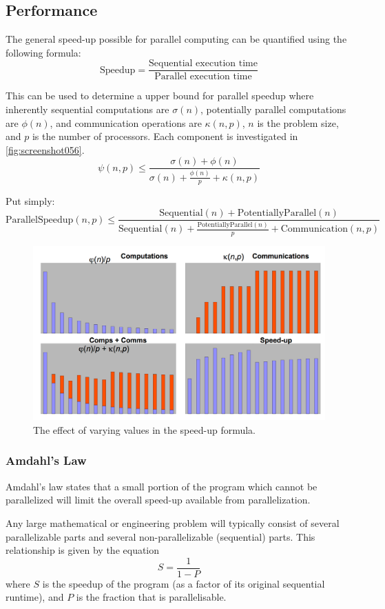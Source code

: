 \subsection{Performance}
The general speed-up possible for parallel computing can be quantified using the following formula:
\[ \text{Speedup} = \frac{\text{Sequential execution time}}{\text{Parallel execution time}} \]

This can be used to determine a upper bound for parallel speedup where inherently sequential computations are $\sigma(n)$, potentially parallel computations are $\phi(n)$, and communication operations are $\kappa(n, p)$, $n$ is the problem size, and $p$ is the number of processors. Each component is investigated in \autoref{fig:screenshot056}.
\[ \psi(n,p) \le \frac{\sigma(n) + \phi(n)}{\sigma(n) + \frac{\phi(n)}{p} + \kappa(n, p)} \]

Put simply:
\[ \text{ParallelSpeedup}(n,p) \le \frac{\text{Sequential}(n) + \text{PotentiallyParallel}(n)}{\text{Sequential}(n) + \frac{\text{PotentiallyParallel}(n)}{p} + \text{Communication}(n, p)} \]

\begin{figure}
\centering
\includegraphics[width=0.7\linewidth]{screenshot056}
\caption{The effect of varying values in the speed-up formula.}
\label{fig:screenshot056}
\end{figure}

\subsubsection{Amdahl's Law}
Amdahl's law states that a small portion of the program which cannot be parallelized will limit the overall speed-up available from parallelization. 

Any large mathematical or engineering problem will typically consist of several parallelizable parts and several non-parallelizable (sequential) parts. This relationship is given by the equation
\[ S = \frac{1}{1 - P} \]
where $S$ is the speedup of the program (as a factor of its original sequential runtime), and $P$ is the fraction that is parallelisable. 

